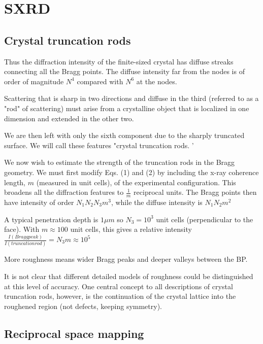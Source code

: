 \section{SXRD}

\subsection{Crystal truncation rods}

Thus the diffraction intensity of the finite-sized crystal has diffuse streaks connecting all the Bragg points. The diffuse intensity far from the nodes is of order of magnitude $N^4$ compared with $N^6$ at the nodes.

Scattering that is sharp in two directions and diffuse in the third (referred to as a "rod" of scattering) must arise from a crystalline object that is localized in one dimension and extended in the other two.

We are then left with only the sixth component due to the sharply truncated surface. We will call these features "crystal truncation rods. '

We now wish to estimate the strength of the truncation rods in the Bragg geometry. We must first modify Eqs. (1) and (2) by including the x-ray coherence length, $m$ (measured in unit cells), of the experimental configuration. This broadens all the diffraction features to $\frac{1}{m}$ reciprocal units. The Bragg points then have intensity of order $N_1 N_2 N_3 m^3$, while the diffuse intensity is $N_1 N_2 m^2$

A typical penetration depth is $1 \mu m$ so $N_3 =10^3$ unit cells (perpendicular to the face). With $m \approx 100$ unit cells, this gives a relative intensity
$\frac{I(Bragg peak)}{I(truncation rod)} = N_3 m \approx 10^5$

More roughness means wider Bragg peaks and deeper valleys between the BP.

It is not clear that different detailed models of roughness could be distinguished at this level of accuracy. One central concept to all descriptions of crystal truncation rods, however, is the continuation of the crystal lattice into the roughened region (not defects, keeping symmetry).

\subsection{Reciprocal space mapping}


\lipsum


